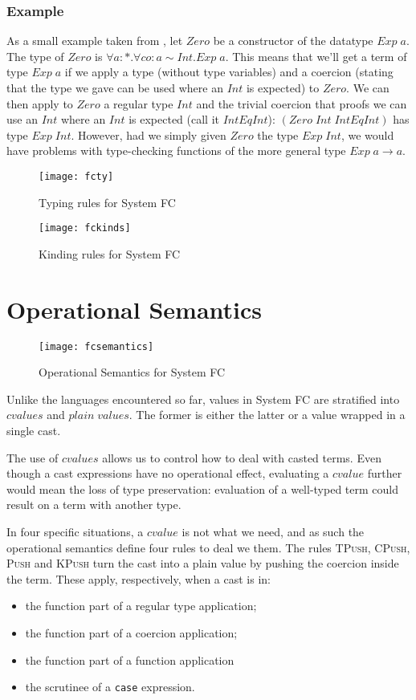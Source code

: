 \subsubsection{Example}
As a small example taken from \cite{fcpaper}, let $Zero$ be a constructor of the datatype $Exp \; a$. The type of $Zero$ is $\forall a:*.\forall co:a\sim Int. Exp \; a$. This means that we'll get a term of type $Exp \; a$ if we apply a type (without type variables) and a coercion (stating that the type we gave can be used where an $Int$ is expected) to $Zero$. We can then apply to $Zero$ a regular type $Int$ and the trivial coercion that proofs we can use an $Int$ where an $Int$ is expected (call it $\mathit{IntEqInt}$): $(\mathit{Zero} \; \mathit{Int} \;\mathit{IntEqInt})$ has type $Exp \; Int$. However, had we simply given $Zero$ the type $Exp \; Int$, we would have problems with type-checking functions of the more general type $Exp \; a \rightarrow a$.

\begin{figure}
  \centering
  \texttt{[image: fcty]}
  \label{fcty}
  \caption{Typing rules for System FC}
\end{figure}
\begin{figure}
  \centering
  \texttt{[image: fckinds]}
  \label{fckinds}
  \caption{Kinding rules for System FC}
\end{figure}

\section{Operational Semantics}
\begin{figure}
  \centering
  \texttt{[image: fcsemantics]}
  \label{fcsemantics}
  \caption{Operational Semantics for System FC}
\end{figure}
Unlike the languages encountered so far, values in System FC are stratified into $cvalues$ and $plain \; values$. The former is either the latter or a value wrapped in a single cast.

The use of $cvalues$ allows us to control how to deal with casted terms. Even though a cast expressions have no operational effect, evaluating a $cvalue$ further would mean the loss of type preservation: evaluation of a well-typed term could result on a term with another type.

In four specific situations, a $cvalue$ is not what we need, and as such the operational semantics define four rules to deal we them. The rules \textsc{TPush}, \textsc{CPush}, \textsc{Push} and \textsc{KPush} turn the cast into a plain value by pushing the coercion inside the term. These apply, respectively, when a cast is in:
\begin{itemize}
\item the function part of a regular type application;
\item the function part of a coercion application;
\item the function part of a function application
\item the scrutinee of a \texttt{case} expression.
\end{itemize}

